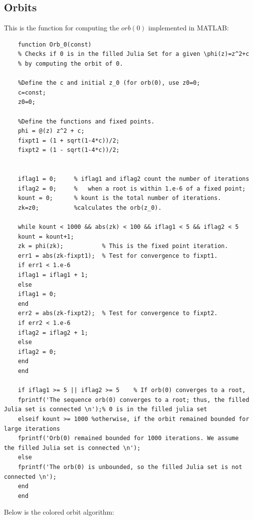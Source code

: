 \documentclass[12pt]{article}
\begin{document}
\subsection{Orbits}\label{orbit}
	This is the function for computing the $orb(0)$ implemented in MATLAB:
	\begin{verbatim}
	function Orb_0(const)
	% Checks if 0 is in the filled Julia Set for a given \phi(z)=z^2+c
	% by computing the orbit of 0.
	
	%Define the c and initial z_0 (for orb(0), use z0=0;
	c=const;
	z0=0;
	
	%Define the functions and fixed points.
	phi = @(z) z^2 + c;
	fixpt1 = (1 + sqrt(1-4*c))/2;
	fixpt2 = (1 - sqrt(1-4*c))/2;
	
	
	iflag1 = 0;     % iflag1 and iflag2 count the number of iterations
	iflag2 = 0;     %   when a root is within 1.e-6 of a fixed point;
	kount = 0;      % kount is the total number of iterations.
	zk=z0;          %calculates the orb(z_0).
	
	while kount < 1000 && abs(zk) < 100 && iflag1 < 5 && iflag2 < 5
	kount = kount+1;
	zk = phi(zk);           % This is the fixed point iteration.
	err1 = abs(zk-fixpt1);  % Test for convergence to fixpt1.
	if err1 < 1.e-6
	iflag1 = iflag1 + 1;
	else
	iflag1 = 0;
	end
	err2 = abs(zk-fixpt2);  % Test for convergence to fixpt2.
	if err2 < 1.e-6
	iflag2 = iflag2 + 1;
	else
	iflag2 = 0;
	end
	end
	
	if iflag1 >= 5 || iflag2 >= 5    % If orb(0) converges to a root, 
	fprintf('The sequence orb(0) converges to a root; thus, the filled Julia set is connected \n');% 0 is in the filled julia set
	elseif kount >= 1000 %otherwise, if the orbit remained bounded for large iterations
	fprintf('Orb(0) remained bounded for 1000 iterations. We assume the filled Julia set is connected \n'); 
	else
	fprintf('The orb(0) is unbounded, so the filled Julia set is not connected \n');
	end
	end
	\end{verbatim}
	
	
	
\noindent	Below is the colored orbit algorithm:\\
\end{document}
